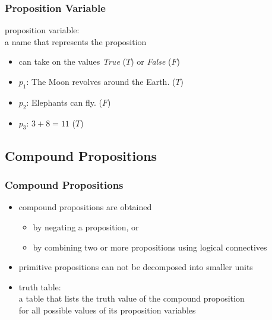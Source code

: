 \documentclass[dvipsnames]{beamer}
\begin{document}
\begin{frame}
  \frametitle{Proposition Variable}

  \begin{definition}
    \alert{proposition variable}:\\
      a name that represents the proposition

    \begin{itemize}
      \item can take on the values \emph {True} ($T$) or \emph{False} ($F$)
    \end{itemize}
  \end{definition}

  \pause
  \begin{example}
    \begin{itemize}
      \item $p_1$: The Moon revolves around the Earth. ($T$)
      \item $p_2$: Elephants can fly. ($F$)
      \item $p_3$: $3+8=11$ ($T$)
    \end{itemize}
  \end{example}
\end{frame}

\subsection{Compound Propositions}

\begin{frame}
  \frametitle{Compound Propositions}

  \begin{itemize}
    \item \alert{compound propositions} are obtained
    \begin{itemize}
      \item by negating a proposition, or
      \item by combining two or more propositions using
        \alert{logical connectives}
    \end{itemize}
    \item \alert{primitive propositions} can not be decomposed
      into smaller units
  \end{itemize}

  \pause
  \begin{itemize}
    \item \alert{truth table}:\\
      a table that lists the truth value of the compound proposition\\
      for all possible values of its proposition variables
  \end{itemize}
\end{frame}
\end{document}
